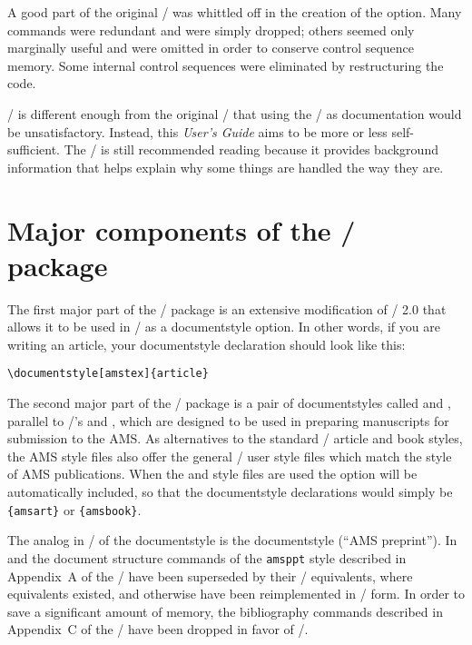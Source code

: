 A good part of the original \amstex/ was whittled off in the creation of the
 option.  Many commands were redundant and were simply
dropped; others seemed only marginally useful and were omitted in order
to conserve control sequence memory.  Some internal control sequences
were eliminated by restructuring the code.

\amslatex/ is different enough from the original \amstex/ that using the
\jt/ as documentation would be unsatisfactory.  Instead, this
{\it User's Guide\/} aims to be more or less self-sufficient.  The \jt/
is still recommended reading because it provides background information
that helps explain why some things are handled the way they are.

\section{Major components of the \amslatex/ package}

The first major part of the \amslatex/ package is an extensive modification
of \amstex/ 2.0 that allows it to be used in \latex/ as a documentstyle
option.  In other words, if you are writing an article,
your documentstyle declaration should look like this:
\begin{verbatim}
\documentstyle[amstex]{article}
\end{verbatim}

The second major part of the \amslatex/ package is a pair of documentstyles
called  and , parallel to \latex/'s 
and , which are designed to be used in preparing manuscripts for
submission to the AMS.
As alternatives to the standard \latex/ article and book styles,
the AMS style files also offer the general \latex/
user style files which match the style of AMS publications.
When the  and  style files
are used the  option will be automatically included, so
that the documentstyle declarations would simply be
\verb"{amsart}" or \verb"{amsbook}".

The analog in \amstex/ of the  documentstyle is the
documentstyle   (``AMS preprint'').  In  and
 the document structure commands of the {\tt amsppt} style
described in Appendix~A of the \jt/ have been superseded by their \latex/
equivalents, where equivalents existed, and otherwise have been
reimplemented in \latex/ form.  In order to save a significant amount of
memory, the bibliography commands described in
Appendix~C of the \jt/ have been dropped in favor of \bibtex/.

